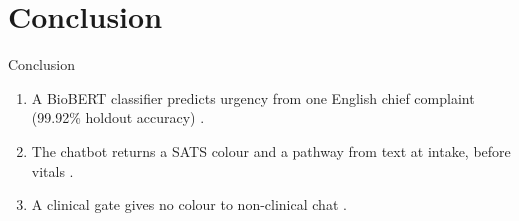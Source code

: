 \section{Conclusion}

\begin{frame}{Conclusion}
	\begin{enumerate}\setlength\itemsep{0.7em}
		\item A BioBERT classifier predicts urgency from one English chief complaint (99.92\% holdout accuracy) \citep{lee2020biobert,triagegeist2025}.
		\item The chatbot returns a SATS colour and a pathway from text at intake, before vitals \citep{satsmanual,stewart2023nlp}.
		\item A clinical gate gives no colour to non-clinical chat \citep{stewart2023nlp}.
	\end{enumerate}
\end{frame}
